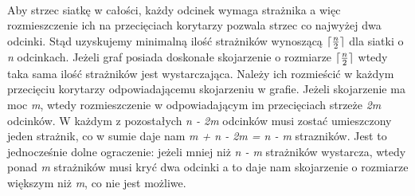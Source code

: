 \documentclass[brudnopis]{xmgr}
\DeclarePairedDelimiter\ceil{\lceil}{\rceil}
\begin{document}
 \\\indent Aby strzec siatkę w całości, każdy odcinek wymaga strażnika a więc rozmieszczenie ich na przecięciach korytarzy pozwala strzec co najwyżej dwa odcinki. Stąd uzyskujemy minimalną ilość strażników wynoszącą $\ceil{\frac{n}{2}}$ dla siatki o \textit{n} odcinkach. Jeżeli graf posiada doskonałe skojarzenie o rozmiarze $\ceil{\frac{n}{2}}$ wtedy taka sama ilość strażników jest wystarczająca. Należy ich rozmieścić w każdym przecięciu korytarzy odpowiadającemu skojarzeniu w grafie. Jeżeli skojarzenie ma moc \textit{m}, wtedy rozmieszczenie w odpowiadającym im przecięciach strzeże \textit{2m} odcinków. W każdym z pozostałych \textit{n - 2m} odcinków musi zostać umieszczony jeden strażnik, co w sumie daje nam \textit{m + n - 2m = n - m} strazników. Jest to jednocześnie dolne ograczenie: jeżeli mniej niż \textit{n - m} strażników wystarcza, wtedy ponad \textit{m} strażników musi kryć dwa odcinki a to daje nam skojarzenie o rozmiarze większym niż \textit{m}, co nie jest możliwe.
\end{document}
